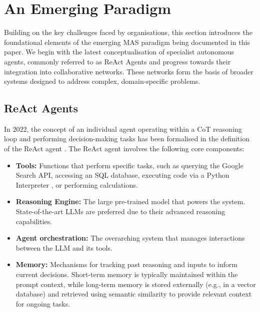 \documentclass{article}
\begin{document}

\section{An Emerging Paradigm} \label{sect:paradigm}

Building on the key challenges faced by organisations, this section introduces the foundational elements of the emerging MAS paradigm being documented in this paper. We begin with the latest conceptualisation of specialist autonomous agents, commonly referred to as ReAct Agents and progress towards their integration into collaborative networks. These networks form the basis of broader systems designed to address complex, domain-specific problems.

\subsection{ReAct Agents}
\label{sec:react}

In 2022, the concept of an individual agent operating within a CoT reasoning loop and performing decision-making tasks has been formalised in the definition of the ReAct agent \cite{yao2022react}. The ReAct agent involves the following core components:

\begin{itemize}
    \item \textbf{Tools:} Functions that perform specific tasks, such as querying the Google Search API, accessing an SQL database, executing code via a Python Interpreter \cite{python2025interpreter}, or performing calculations.
    \item \textbf{Reasoning Engine:} The large pre-trained model that powers the system. State-of-the-art LLMs are preferred due to their advanced reasoning capabilities.
    \item \textbf{Agent orchestration:} The overarching system that manages interactions between the LLM and its tools.
    \item \textbf{Memory:} Mechanisms for tracking past reasoning and inputs to inform current decisions. Short-term memory is typically maintained within the prompt context, while long-term memory is stored externally (e.g., in a vector database) and retrieved using semantic similarity to provide relevant context for ongoing tasks.
\end{itemize}
\end{document}
